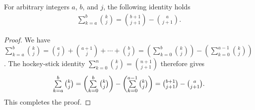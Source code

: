 \begin{lemma}
  \label{lem:generalized-hockey-stick-identity}
  For arbitrary integers $a$, $b$, and $j$, the following identity holds
  \begin{align*}
    \sum_{k=a}^{b} \binom{k}{j} = \binom{b+1}{j+1} - \binom{a}{j+1}.
  \end{align*}
  \begin{proof}
    We have
    $\sum_{k=a}^{b} \binom{k}{j}
    = \binom{a}{j} + \binom{a+1}{j} + \cdots + \binom{b}{j}
    = \left( \sum_{k=0}^{b} \binom{k}{j} \right) - \left( \sum_{k=0}^{a-1} \binom{k}{j} \right)$.
    The hockey-stick identity $\sum_{k=0}^{n} \binom{k}{j} = \binom{n+1}{j+1}$ therefore gives
    \begin{align*}
      \mathop{\textstyle\sum}_{k=a}^{b} \tbinom{k}{j}
      = \left( \mathop{\textstyle\sum}_{k=0}^{b} \tbinom{k}{j} \right) - \left( \mathop{\textstyle\sum}_{k=0}^{a-1} \tbinom{k}{j} \right)
      = \tbinom{b+1}{j+1} - \tbinom{a}{j+1}.
    \end{align*}
    This completes the proof.
  \end{proof}
\end{lemma}
